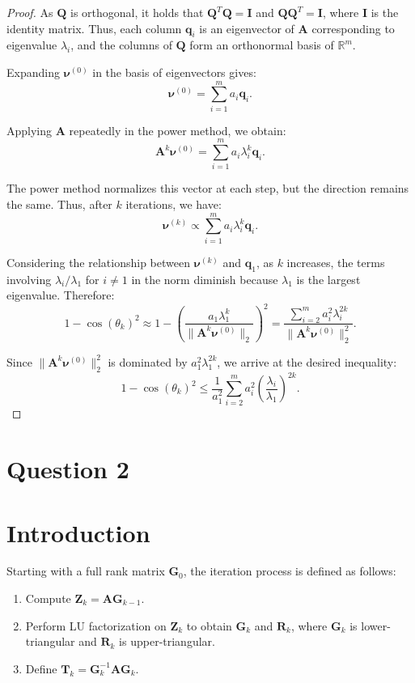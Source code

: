 \documentclass{article}
\begin{document}
\begin{proof}
As $\boldsymbol{Q}$ is orthogonal, it holds that $\boldsymbol{Q}^T \boldsymbol{Q} = \boldsymbol{I}$ and $\boldsymbol{Q} \boldsymbol{Q}^T = \boldsymbol{I}$, where $\boldsymbol{I}$ is the identity matrix. Thus, each column $\boldsymbol{q}_i$ is an eigenvector of $\boldsymbol{A}$ corresponding to eigenvalue $\lambda_i$, and the columns of $\boldsymbol{Q}$ form an orthonormal basis of $\mathbb{R}^m$.

Expanding $\boldsymbol{\nu}^{(0)}$ in the basis of eigenvectors gives:
\[
\boldsymbol{\nu}^{(0)} = \sum_{i=1}^m a_i \boldsymbol{q}_i.
\]

Applying $\boldsymbol{A}$ repeatedly in the power method, we obtain:
\[
\boldsymbol{A}^k \boldsymbol{\nu}^{(0)} = \sum_{i=1}^m a_i \lambda_i^k \boldsymbol{q}_i.
\]

The power method normalizes this vector at each step, but the direction remains the same. Thus, after $k$ iterations, we have:
\[
\boldsymbol{\nu}^{(k)} \propto \sum_{i=1}^m a_i \lambda_i^k \boldsymbol{q}_i.
\]

Considering the relationship between $\boldsymbol{\nu}^{(k)}$ and $\boldsymbol{q}_1$, as $k$ increases, the terms involving $\lambda_i/\lambda_1$ for $i \neq 1$ in the norm diminish because $\lambda_1$ is the largest eigenvalue. Therefore:
\[
1 - \cos(\theta_k)^2 \approx 1 - \left( \frac{a_1 \lambda_1^k}{\|\boldsymbol{A}^k \boldsymbol{\nu}^{(0)}\|_2} \right)^2 = \frac{\sum_{i=2}^m a_i^2 \lambda_i^{2k}}{\|\boldsymbol{A}^k \boldsymbol{\nu}^{(0)}\|_2^2}.
\]

Since $\|\boldsymbol{A}^k \boldsymbol{\nu}^{(0)}\|_2^2$ is dominated by $a_1^2 \lambda_1^{2k}$, we arrive at the desired inequality:
\[
1 - \cos(\theta_k)^2 \leq \frac{1}{a_1^2} \sum_{i=2}^m a_i^2 \left( \frac{\lambda_i}{\lambda_1} \right)^{2k}.
\]
\end{proof}
\section{Question 2}

\section*{Introduction}
Starting with a full rank matrix $\boldsymbol{G}_0$, the iteration process is defined as follows:

\begin{enumerate}
    \item Compute $\boldsymbol{Z}_k = \boldsymbol{A} \boldsymbol{G}_{k-1}$.
    \item Perform LU factorization on $\boldsymbol{Z}_k$ to obtain $\boldsymbol{G}_k$ and $\boldsymbol{R}_k$, where $\boldsymbol{G}_k$ is lower-triangular and $\boldsymbol{R}_k$ is upper-triangular.
    \item Define $\boldsymbol{T}_k = \boldsymbol{G}_k^{-1} \boldsymbol{A} \boldsymbol{G}_k$.
\end{enumerate}
\end{document}
